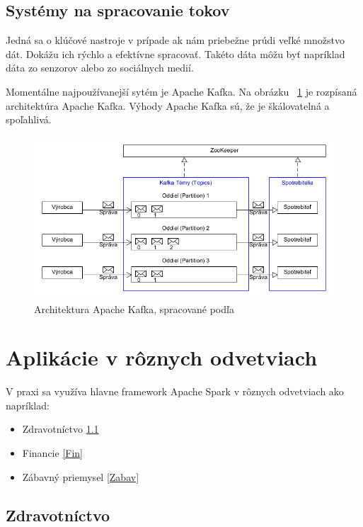 \documentclass[10pt,slovak,a4paper]{article}
\begin{document}
\subsection {Systémy na spracovanie tokov}

Jedná sa o klúčové nastroje v prípade ak nám priebežne prúdi veľké množstvo dát. Dokážu ich rýchlo a efektívne spracovať. Takéto dáta môžu byť napríklad dáta zo senzorov alebo zo sociálnych medií.

Momentálne najpoužívanejší sytém je Apache Kafka. Na obrázku ~\ref{ApacheKafkaObrazok} je rozpísaná architektúra Apache Kafka. Výhody Apache Kafka sú, že je škálovatelná a spoľahlivá. ~\cite{ApacheKafka}
\begin{figure}[H]
  \centering
  \includegraphics[width=1\textwidth]{Kafka_prelozene.png}
  \caption{Architektura Apache Kafka, spracované podľa \cite{ApacheKafka}}
  \label{ApacheKafkaObrazok}
\end{figure}



\section {Aplikácie v rôznych odvetviach} \label {Aplikacie}

V praxi sa využíva hlavne framework Apache Spark v rôznych odvetviach ako napríklad:
\begin{itemize}
\item Zdravotníctvo \ref{Zdrav}
\item Financie \ref {Fin}
\item Zábavný priemysel \ref {Zabav}
\end{itemize}

\subsection {Zdravotníctvo} \label {Zdrav}
\end{document}

